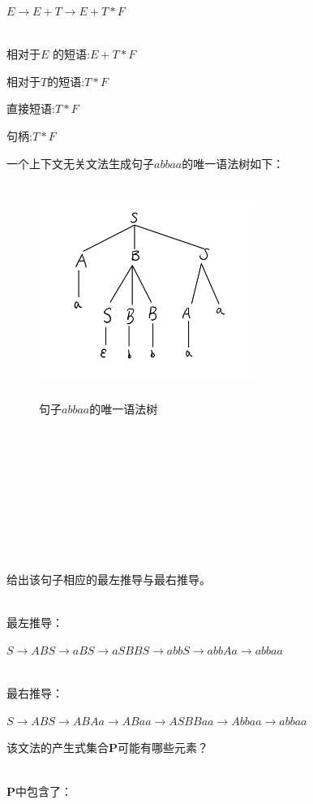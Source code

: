 \documentclass{cisXXX} %
\begin{document}
\begin{CJK}{UTF8}{gbsn}
$E\rightarrow E+T\rightarrow E+T*F$

~\\

相对于$E$ 的短语:\quad$E+T*F$

相对于$T$的短语:\quad$T*F$

直接短语:\quad$T*F$

句柄:\quad$T*F$

\HWproblem
一个上下文无关文法生成句子$abbaa$的唯一语法树如下：

\begin{figure}[ht]
	\centering
	\includegraphics[width=7cm,height=7cm]{5.png}
	\caption{句子$abbaa$的唯一语法树}
	\label{fig:label}
\end{figure}  
~\\
~\\
~\\
~\\
~\\
~\\
~\\
~\\
~\\
\HWsubproblem
给出该句子相应的最左推导与最右推导。

~\\
最左推导：

$S\rightarrow ABS \rightarrow aBS \rightarrow aSBBS \rightarrow abbS \rightarrow abbAa \rightarrow abbaa$

~\\
最右推导：

$S\rightarrow ABS \rightarrow ABAa \rightarrow ABaa \rightarrow ASBBaa \rightarrow Abbaa \rightarrow abbaa$

\HWsubproblem
该文法的产生式集合\textbf{P}可能有哪些元素？

~\\
\textbf{P}中包含了：
~\\


\end{CJK}
\end{document}
